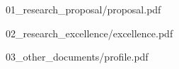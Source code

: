 \documentclass{article}
\begin{document}

  {01_research_proposal/proposal.pdf}

  {02_research_excellence/excellence.pdf}

  {03_other_documents/profile.pdf}
\end{document}
